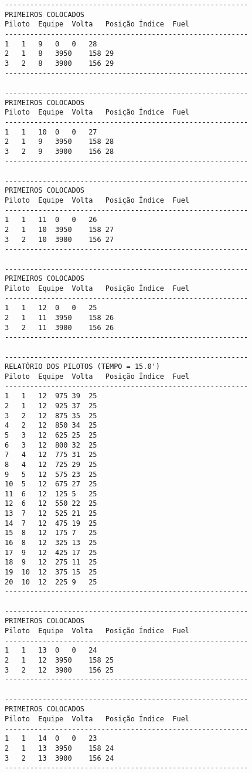 \documentclass[12pt]{article}
\begin{document}
\begin{verbatim}
----------------------------------------------------------
PRIMEIROS COLOCADOS
Piloto	Equipe	Volta	Posição	Índice	Fuel
----------------------------------------------------------
1	1	9	0	0	28
2	1	8	3950	158	29
3	2	8	3900	156	29
----------------------------------------------------------

----------------------------------------------------------
PRIMEIROS COLOCADOS
Piloto	Equipe	Volta	Posição	Índice	Fuel
----------------------------------------------------------
1	1	10	0	0	27
2	1	9	3950	158	28
3	2	9	3900	156	28
----------------------------------------------------------

----------------------------------------------------------
PRIMEIROS COLOCADOS
Piloto	Equipe	Volta	Posição	Índice	Fuel
----------------------------------------------------------
1	1	11	0	0	26
2	1	10	3950	158	27
3	2	10	3900	156	27
----------------------------------------------------------

----------------------------------------------------------
PRIMEIROS COLOCADOS
Piloto	Equipe	Volta	Posição	Índice	Fuel
----------------------------------------------------------
1	1	12	0	0	25
2	1	11	3950	158	26
3	2	11	3900	156	26
----------------------------------------------------------

----------------------------------------------------------
RELATÓRIO DOS PILOTOS (TEMPO = 15.0')
Piloto	Equipe	Volta	Posição	Índice	Fuel
----------------------------------------------------------
1	1	12	975	39	25
2	1	12	925	37	25
3	2	12	875	35	25
4	2	12	850	34	25
5	3	12	625	25	25
6	3	12	800	32	25
7	4	12	775	31	25
8	4	12	725	29	25
9	5	12	575	23	25
10	5	12	675	27	25
11	6	12	125	5	25
12	6	12	550	22	25
13	7	12	525	21	25
14	7	12	475	19	25
15	8	12	175	7	25
16	8	12	325	13	25
17	9	12	425	17	25
18	9	12	275	11	25
19	10	12	375	15	25
20	10	12	225	9	25
----------------------------------------------------------

----------------------------------------------------------
PRIMEIROS COLOCADOS
Piloto	Equipe	Volta	Posição	Índice	Fuel
----------------------------------------------------------
1	1	13	0	0	24
2	1	12	3950	158	25
3	2	12	3900	156	25
----------------------------------------------------------

----------------------------------------------------------
PRIMEIROS COLOCADOS
Piloto	Equipe	Volta	Posição	Índice	Fuel
----------------------------------------------------------
1	1	14	0	0	23
2	1	13	3950	158	24
3	2	13	3900	156	24
----------------------------------------------------------


\end{verbatim}
\end{document}
